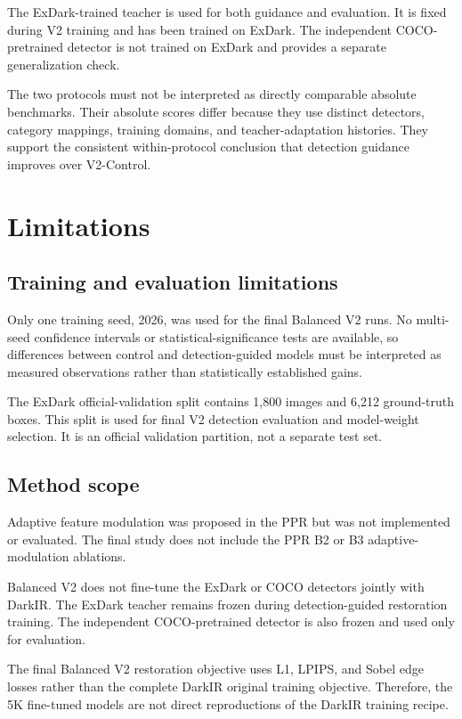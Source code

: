 The ExDark-trained teacher is used for both guidance and evaluation.
It is fixed during V2 training and has been trained on ExDark. The
independent COCO-pretrained detector is not trained on ExDark and provides
a separate generalization check.

The two protocols must not be interpreted as directly comparable absolute
benchmarks. Their absolute scores differ because they use distinct
detectors, category mappings, training domains, and teacher-adaptation
histories. They support the consistent within-protocol conclusion that
detection guidance improves over V2-Control.

\section{Limitations}
\label{sec:limitations}

\subsection{Training and evaluation limitations}

Only one training seed, 2026, was used for the final Balanced V2 runs.
No multi-seed confidence intervals or statistical-significance tests are
available, so differences between control and detection-guided models
must be interpreted as measured observations rather than statistically
established gains.

The ExDark official-validation split contains 1,800 images and 6,212
ground-truth boxes. This split is used for final V2 detection evaluation
and model-weight selection. It is an official validation partition, not a
separate test set.

\subsection{Method scope}

Adaptive feature modulation was proposed in the PPR but was not implemented
or evaluated. The final study does not include the PPR B2 or B3
adaptive-modulation ablations.

Balanced V2 does not fine-tune the ExDark or COCO detectors jointly with
DarkIR. The ExDark teacher remains frozen during detection-guided
restoration training. The independent COCO-pretrained detector is also
frozen and used only for evaluation.

The final Balanced V2 restoration objective uses L1, LPIPS, and Sobel edge
losses rather than the complete DarkIR original training objective.
Therefore, the 5K fine-tuned models are not direct reproductions of the
DarkIR training recipe.

